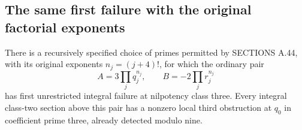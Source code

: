 \subsection{The same first failure with the original factorial exponents}
\label{sec:ghost-class3-original}

\begin{theorem}
\label{thm:ghost-original-first-integral-class3}
There is a recursively specified choice of primes permitted
by SECTIONS A.44, with its original exponents
\(n_j=(j+4)!\), for which the ordinary pair
\[
              A=3\prod_jq_j^{n_j},\qquad
              B=-2\prod_jr_j^{n_j}
\]
has first unrestricted integral failure at nilpotency
class three. Every integral class-two section above
this pair has a nonzero local third obstruction at
\(q_0\) in coefficient prime three, already detected
modulo nine.
\end{theorem}
